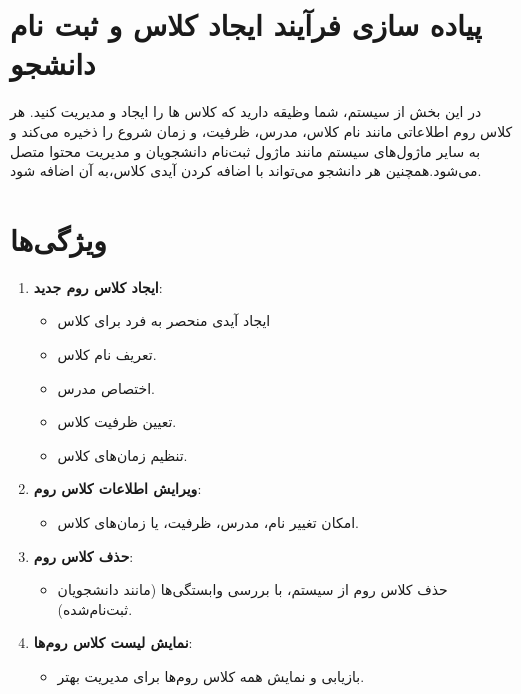 \documentclass[a4paper,12pt]{article}
\begin{document}
\maketitle

\section*{پیاده سازی فرآیند ایجاد کلاس و ثبت نام دانشجو}
در این بخش از سیستم، شما وظیقه دارید که کلاس ها را ایجاد و مدیریت کنید. هر کلاس روم اطلاعاتی مانند نام کلاس، مدرس، ظرفیت، و زمان شروع را ذخیره می‌کند و به سایر ماژول‌های سیستم مانند ماژول ثبت‌نام دانشجویان و مدیریت محتوا متصل می‌شود.همچنین هر دانشجو می‌تواند با اضافه کردن آیدی کلاس،به آن اضافه شود.

\section*{ویژگی‌ها}
\begin{enumerate}
    \item \textbf{ایجاد کلاس روم جدید}:
    \begin{itemize}
        \item ایجاد آیدی منحصر به فرد برای کلاس
        \item تعریف نام کلاس.
        \item اختصاص مدرس.
        \item تعیین ظرفیت کلاس.
        \item تنظیم زمان‌های کلاس.
    \end{itemize}
    \item \textbf{ویرایش اطلاعات کلاس روم}:
    \begin{itemize}
        \item امکان تغییر نام، مدرس، ظرفیت، یا زمان‌های کلاس.
    \end{itemize}
    \item \textbf{حذف کلاس روم}:
    \begin{itemize}
        \item حذف کلاس روم از سیستم، با بررسی وابستگی‌ها (مانند دانشجویان ثبت‌نام‌شده).
    \end{itemize}
    \item \textbf{نمایش لیست کلاس روم‌ها}:
    \begin{itemize}
        \item بازیابی و نمایش همه کلاس روم‌ها برای مدیریت بهتر.
    \end{itemize}
\end{enumerate}
\end{document}
